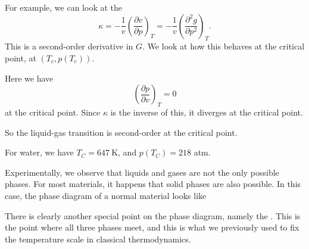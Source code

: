 \documentclass[a4paper]{article}
\def\isothermii{(1.8,0.3) (1.9,0.26107) (2.0,0.23150) (2.1,0.21303) (2.2,0.20153) (2.3,0.19444) (2.4,0.19016) (2.5,0.18767) (2.6,0.18629) (2.7,0.18560) (2.8,0.18530) (2.9,0.18521) (3.0,0.18519) (3.1,0.18518) (3.2,0.18513) (3.3,0.18499) (3.4,0.18477) (3.5,0.18444) (3.6,0.18401) (3.7,0.18347) (3.8,0.18285) (3.9,0.18213) (4.0,0.18133) (4.1,0.18046) (4.2,0.17952) (4.3,0.17852) (4.4,0.17747) (4.5,0.17637) (4.6,0.17523) (4.7,0.17406) (4.8,0.17285) (4.9,0.17163) (5.0,0.17038) (5.1,0.16911) (5.2,0.16783) (5.3,0.16654) (5.4,0.16524) (5.5,0.16393) (5.6,0.16263) (5.7,0.16132) (5.8,0.16001) (5.9,0.15871) (6.0,0.15741) (6.1,0.15612) (6.2,0.15483) (6.3,0.15355) (6.4,0.15228) (6.5,0.15102) (6.6,0.14977) (6.7,0.14853) (6.8,0.14730) (6.9,0.14608) (7.0,0.14488) (7.1,0.14368) (7.2,0.14250) (7.3,0.14133) (7.4,0.14018) (7.5,0.13903) (7.6,0.13790) (7.7,0.13679) (7.8,0.13568) (7.9,0.13459) (8.0,0.13352) (8.1,0.13245) (8.2,0.13140) (8.3,0.13037) (8.4,0.12934) (8.5,0.12833) (8.6,0.12733) (8.7,0.12634) (8.8,0.12537) (8.9,0.12441) (9.0,0.12346) (9.1,0.12252) (9.2,0.12160) (9.3,0.12068) (9.4,0.11978) (9.5,0.11889) (9.6,0.11801) (9.7,0.11715) (9.8,0.11629) (9.9,0.11545) (10.0,0.11461) (10.1,0.11379) (10.2,0.11297) (10.3,0.11217) (10.4,0.11138) (10.5,0.11060) (10.6,0.10982) (10.7,0.10906) (10.8,0.10831) (10.9,0.10756) (11.0,0.10683) (11.1,0.10610) (11.2,0.10539) (11.3,0.10468) (11.4,0.10398) (11.5,0.10329) (11.6,0.10261) (11.7,0.10193) (11.8,0.10127) (11.9,0.10061) (12.0,0.09996) (12.1,0.09932) (12.2,0.09868) (12.3,0.09806) (12.4,0.09744) (12.5,0.09683) (12.6,0.09622) (12.7,0.09562) (12.8,0.09503) (12.9,0.09445) (13.0,0.09387) (13.1,0.09330) (13.2,0.09274) (13.3,0.09218) (13.4,0.09163) (13.5,0.09109) (13.6,0.09055) (13.7,0.09001) (13.8,0.08949) (13.9,0.08897) (14.0,0.08845) (14.1,0.08794) (14.2,0.08744) (14.3,0.08694) (14.4,0.08645) (14.5,0.08596) (14.6,0.08548) (14.7,0.08500) (14.8,0.08453) (14.9,0.08406) (15.0,0.08360)}
\begin{document}
For example, we can look at the \index{$\kappa$}
\[
  \kappa = -\frac{1}{v} \left(\frac{\partial v}{\partial p}\right)_T = -\frac{1}{v} \left(\frac{\partial^2 g}{\partial p^2}\right)_T.
\]
This is a second-order derivative in $G$. We look at how this behaves at the critical point, at $(T_c, p(T_c))$.
\begin{center}
\end{center}
Here we have
\[
  \left(\frac{\partial p}{\partial v}\right)_T = 0
\]
at the critical point. Since $\kappa$ is the inverse of this, it diverges at the critical point.

So the liquid-gas transition is second-order at the critical point.

\begin{eg}
  For water, we have $T_C = \SI{647}{\kelvin}$, and $p(T_C) = 218$ atm.
\end{eg}

Experimentally, we observe that liquids and gases are not the only possible phases. For most materials, it happens that solid phases are also possible. In this case, the phase diagram of a normal material looks like
\begin{center}
\end{center}
There is clearly another special point on the phase diagram, namely the . This is the point where all three phases meet, and this is what we previously used to fix the temperature scale in classical thermodynamics.
\end{document}

